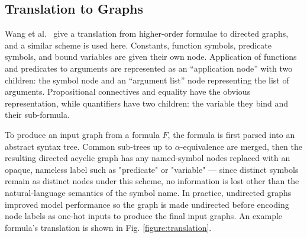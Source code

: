 \documentclass{llncs}
\begin{document}
\subsection{Translation to Graphs}
Wang et al.~\cite{formula-graph} give a translation from higher-order formulae to directed graphs, and a similar scheme is used here.
Constants, function symbols, predicate symbols, and bound variables are given their own node.
Application of functions and predicates to arguments are represented as an ``application node'' with two children: the symbol node and an ``argument list'' node representing the list of arguments.
Propositional connectives and equality have the obvious representation, while quantifiers have two children: the variable they bind and their sub-formula.

To produce an input graph from a formula \(F\), the formula is first parsed into an abstract syntax tree.
Common sub-trees up to \(\alpha\)-equivalence are merged, then the resulting directed acyclic graph has any named-symbol nodes replaced with an opaque, nameless label such as "predicate" or "variable" --- since distinct symbols remain as distinct nodes under this scheme, no information is lost other than the natural-language semantics of the symbol name.
In practice, undirected graphs improved model performance so the graph is made undirected before encoding node labels as one-hot inputs to produce the final input graphs.
An example formula's translation is shown in Fig. \ref{figure:translation}.
\end{document}
